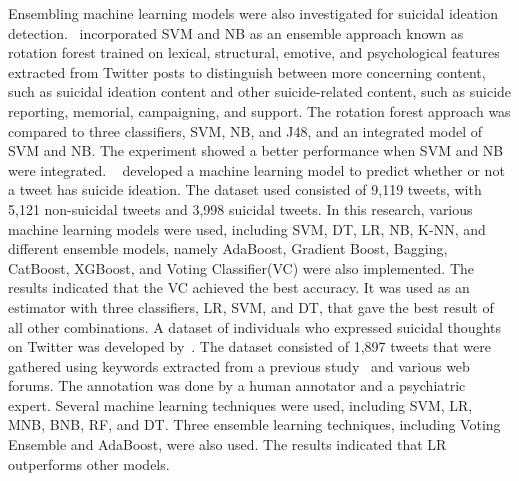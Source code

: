 \documentclass[sn-mathphys,Numbered]{sn-jnl}%
\begin{document}
 Ensembling machine learning models were also investigated for suicidal ideation detection.~\citet{32n10.1145/2700171.2791023} incorporated SVM and NB as an ensemble approach known as rotation forest trained on lexical, structural, emotive, and psychological features extracted from Twitter posts to distinguish between more concerning content, such as suicidal ideation content and other suicide-related content, such as suicide reporting, memorial, campaigning, and support. The rotation forest approach was compared to three classifiers, SVM, NB, and J48, and an integrated model of SVM and NB. The experiment showed a better performance when SVM and NB were integrated.  
 ~\citet{9528252} developed a machine learning model to predict whether or not a tweet has suicide ideation. The dataset used consisted of 9,119 tweets, with 5,121 non-suicidal tweets and 3,998 suicidal tweets. In this research, various machine learning models were used, including SVM, DT, LR, NB, K-NN, and different ensemble models, namely AdaBoost, Gradient Boost, Bagging, CatBoost, XGBoost, and Voting Classifier(VC) were also implemented. The results indicated that the VC achieved the best accuracy. It was used as an estimator with three classifiers, LR, SVM, and DT, that gave the best result of all other combinations.  %
A dataset of individuals who expressed suicidal thoughts on Twitter was developed by~\cite{9388638}. The dataset consisted of 1,897 tweets that were gathered using keywords extracted from a previous study~\cite{COLOMBO2016291} and various web forums. The annotation was done by a human annotator and a psychiatric expert. Several machine learning techniques were used, including SVM, LR, MNB, BNB, RF, and DT. Three ensemble learning techniques, including Voting Ensemble and AdaBoost, were also used. The results indicated that LR outperforms other models. %
\end{document}
